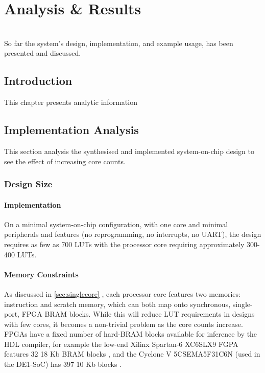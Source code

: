 \chapter{Analysis \& Results}
\startcontents[chapters]
\noindent\\
So far the system's design, implementation, and example usage, has been presented and discussed.

\section{Introduction}
This chapter presents analytic information

\section{Implementation Analysis}
This section analysis the synthesised and implemented system-on-chip design to see the effect of increasing core counts.

\subsection{Design Size}
\subsubsection{Implementation}
On a minimal system-on-chip configuration, with one core and minimal peripherals and features (no reprogramming, no interrupts, no UART), the design requires as few as 700 LUTs with the processor core requiring approximately 300-400 LUTs.

\subsubsection{Memory Constraints}
As discussed in \cref{sec:singlecore} , each processor core features two memories: instruction and scratch memory, which can both map onto synchronous, single-port, FPGA BRAM blocks. While this will reduce LUT requirements in designs with few cores, it becomes a non-trivial problem as the core counts increase. FPGAs have a fixed number of hard-BRAM blocks available for inference by the HDL compiler, for example the low-end Xilinx Spartan-6 XC6SLX9 FGPA features 32 18 Kb BRAM blocks \cite[p.~2]{s6fam}, and the Cyclone V 5CSEMA5F31C6N (used in the DE1-SoC) has 397 10 Kb blocks \cite[p.~22]{cvfam}.


